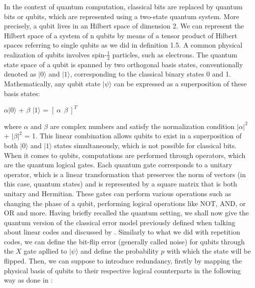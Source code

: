 \documentclass{Configuration_Files/PoliMi3i_thesis}
\begin{document}
In the context of quantum computation, classical bits are replaced by quantum bits or qubits, which are represented using a two-state quantum system. More precisely, a qubit lives in an Hilbert space of dimension 2. We can represent the Hilbert space of a system of n qubits by means of a tensor product of Hilbert spaces referring to single qubits as we did in definition 1.5. A common physical realization of qubits involves spin-$\frac{1}{2}$ particles, such as electrons. The quantum state space of a qubit is spanned by two orthogonal basis states, conventionally denoted as $ |0 \rangle$ and $ |1 \rangle$, corresponding to the classical binary states 0 and 1. Mathematically, any qubit state 
$ |\psi \rangle$ can be expressed as a superposition of these basis states:


\begin{center}
	$\alpha |0 \rangle$ + $\beta$ $|1 \rangle$ =  $[ \ \alpha \ \ \beta \ ]^T $
\end{center}

where $\alpha$ and $\beta$ are complex numbers and satisfy the normalization condition $|\alpha|^2$ + $|\beta|^2$ = 1. This linear combination allows qubits to exist in a superposition of both $|0 \rangle$ and $ |1 \rangle$  states simultaneously, which is not possible for classical bits.  \newline
When it comes to qubits, computations are performed through operators, which are the quantum logical gates. Each quantum gate corresponds to a unitary operator, which is a linear transformation that preserves the norm of vectors (in this case, quantum states) and is represented by a square matrix that is both unitary and Hermitian. These gates can perform various operations such as changing the phase of a qubit, performing logical operations like NOT, AND, or OR and more.\newline
Having briefly recalled the quantum setting, we shall now give the quantum version of the classical error model previously defined when talking about linear codes and discussed by \cite{Cha06}. \newline
Similarly to what we did with repetition codes, we can define the bit-flip error (generally called noise) for qubits through the $X$ gate apllied to $|\psi \rangle$ and define the probability $p$ with which the state will be flipped.\newline
Then, we can suppose to introduce redundancy, firstly by mapping the physical basis of qubits to their respective logical counterparts in the following way as done in \cite{Nie06}:
\end{document}
